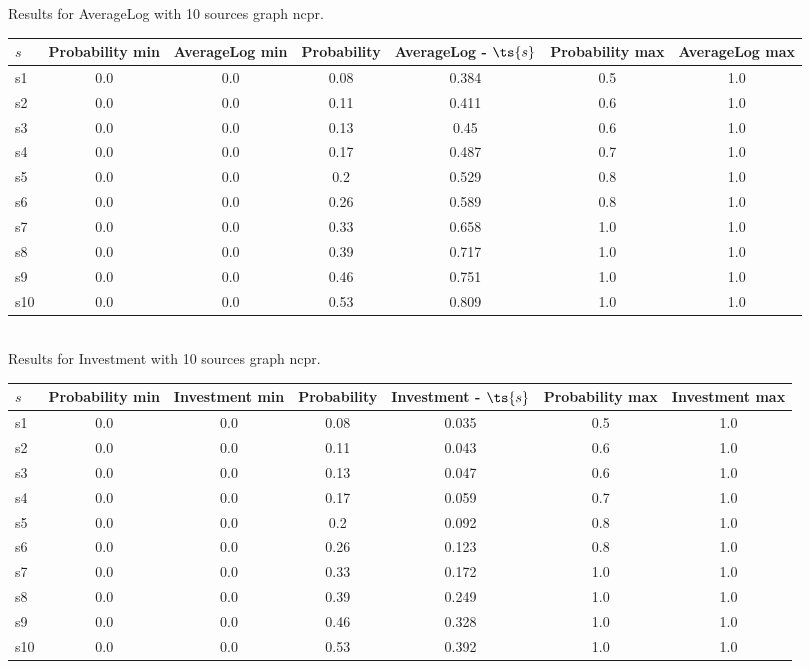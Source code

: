 \documentclass{article}
\begin{document}
\noindent Results for AverageLog with 10 sources graph ncpr.

\noindent\begin{tabular}{|l|c|c|c|c|c|c|}
\hline
$s$& Probability min & AverageLog min & Probability & AverageLog - $\ts{s}$ & Probability max & AverageLog max\\
\hline
s1 &0.0 & 0.0 & 0.08 & 0.384 & 0.5 & 1.0\\
\hline
s2 &0.0 & 0.0 & 0.11 & 0.411 & 0.6 & 1.0\\
\hline
s3 &0.0 & 0.0 & 0.13 & 0.45 & 0.6 & 1.0\\
\hline
s4 &0.0 & 0.0 & 0.17 & 0.487 & 0.7 & 1.0\\
\hline
s5 &0.0 & 0.0 & 0.2 & 0.529 & 0.8 & 1.0\\
\hline
s6 &0.0 & 0.0 & 0.26 & 0.589 & 0.8 & 1.0\\
\hline
s7 &0.0 & 0.0 & 0.33 & 0.658 & 1.0 & 1.0\\
\hline
s8 &0.0 & 0.0 & 0.39 & 0.717 & 1.0 & 1.0\\
\hline
s9 &0.0 & 0.0 & 0.46 & 0.751 & 1.0 & 1.0\\
\hline
s10 &0.0 & 0.0 & 0.53 & 0.809 & 1.0 & 1.0\\
\hline
\end{tabular}\\

\noindent Results for Investment with 10 sources graph ncpr.

\noindent\begin{tabular}{|l|c|c|c|c|c|c|}
\hline
$s$& Probability min & Investment min & Probability & Investment - $\ts{s}$ & Probability max & Investment max\\
\hline
s1 &0.0 & 0.0 & 0.08 & 0.035 & 0.5 & 1.0\\
\hline
s2 &0.0 & 0.0 & 0.11 & 0.043 & 0.6 & 1.0\\
\hline
s3 &0.0 & 0.0 & 0.13 & 0.047 & 0.6 & 1.0\\
\hline
s4 &0.0 & 0.0 & 0.17 & 0.059 & 0.7 & 1.0\\
\hline
s5 &0.0 & 0.0 & 0.2 & 0.092 & 0.8 & 1.0\\
\hline
s6 &0.0 & 0.0 & 0.26 & 0.123 & 0.8 & 1.0\\
\hline
s7 &0.0 & 0.0 & 0.33 & 0.172 & 1.0 & 1.0\\
\hline
s8 &0.0 & 0.0 & 0.39 & 0.249 & 1.0 & 1.0\\
\hline
s9 &0.0 & 0.0 & 0.46 & 0.328 & 1.0 & 1.0\\
\hline
s10 &0.0 & 0.0 & 0.53 & 0.392 & 1.0 & 1.0\\
\hline
\end{tabular}\\
\end{document}
